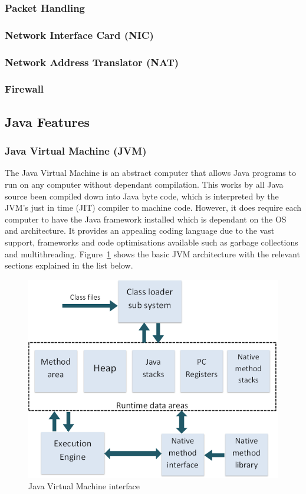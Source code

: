 \documentclass[final_report.tex]{subfiles}
\begin{document}
\subsubsection{Packet Handling}
\subsubsection{Network Interface Card (NIC)}
\subsubsection{Network Address Translator (NAT)}
\subsubsection{Firewall}

\subsection{Java Features}
\subsubsection{Java Virtual Machine (JVM)}
The Java Virtual Machine is an abstract computer that allows Java programs to run on any computer without dependant compilation. This works by all Java source been compiled down into Java byte code, which is interpreted by the JVM's just in time (JIT) compiler to machine code. However, it does require each computer to have the Java framework installed which is dependant on the OS and architecture. It provides an appealing coding language due to the vast support, frameworks and code optimisations available such as garbage collections and multithreading. Figure~\ref{fig:jvm} shows the basic JVM architecture with the relevant sections explained in the list below.

\begin{figure}[H]
	\centering
	\includegraphics[width=\textwidth]{img/jvm.png}
	\caption{Java Virtual Machine interface \cite{jvm}}
	\label{fig:jvm}
\end{figure}
\end{document}
